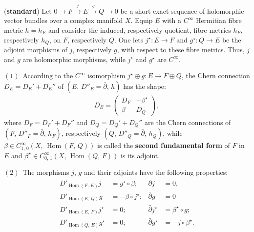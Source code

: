 \documentclass[12pt]{article}
\begin{document}
\begin{Prop}({\bf standard})\label{Prop:standard_exact-seq_2nd-fundamental} Let $0\longrightarrow F {\stackrel{j}{\longrightarrow}} E {\stackrel{g}{\longrightarrow}} Q \longrightarrow 0$ be a short exact sequence of holomorphic vector bundles over a complex manifold $X$. Equip $E$ with a $C^\infty$ Hermitian fibre metric $h=h_E$ and consider the induced, respectively quotient, fibre metrics $h_F$, respectively $h_Q$, on $F$, respectively $Q$. One lets $j^\star:E\longrightarrow F$ and $g^\star:Q\longrightarrow E$ be the adjoint morphisms of $j$, respectively $g$, with respect to these fibre metrics. Thus, $j$ and $g$ are holomorphic morphisms, while $j^\star$ and $g^\star$ are $C^\infty$.

\vspace{1ex}

$(1)$\, According to the $C^\infty$ isomorphism $j^\star\oplus g:E\longrightarrow F\oplus Q$, the Chern connection $D_E = D_E' + D_E''$ of $(E,\, D''_E=\bar\partial,\, h)$ has the shape: \begin{eqnarray*}D_E = \begin{pmatrix} D_F & -\beta^\star \\
    \beta & D_Q\end{pmatrix},\end{eqnarray*} where $D_F = D_F' + D_F''$ and $D_Q = D_Q' + D_Q''$ are the Chern connections of $(F,\,D''_F=\bar\partial,\, h_F)$, respectively $(Q,\,D''_Q=\bar\partial,\, h_Q)$, while $\beta\in C^\infty_{1,\,0}(X,\,\operatorname{Hom}(F,\,Q))$ is called the {\bf second fundamental form} of $F$ in $E$ and $\beta^\star\in C^\infty_{0,\,1}(X,\,\operatorname{Hom}(Q,\,F))$ is its adjoint.

\vspace{1ex}

$(2)$\, The morphisms $j$, $g$ and their adjoints have the following properties: \begin{align}\label{eqn:j-g_adjoints_prop}\nonumber D'_{\operatorname{Hom}(F,\,E)}j & =  g^\star\circ\beta;  &    \bar\partial j & =  0, \\
\nonumber  D'_{\operatorname{Hom}(E,\,Q)}g & =  -\beta\circ j^\star;  &  \bar\partial g & = 0 \\ 
\nonumber D'_{\operatorname{Hom}(E,\,F)}j^\star & =  0;  &    \bar\partial j^\star & =  \beta^\star\circ g; \\
 D'_{\operatorname{Hom}(Q,\,E)}g^\star & =  0;   &  \bar\partial g^\star & = -j\circ\beta^\star.\end{align} 
  

\end{Prop}
\end{document}

